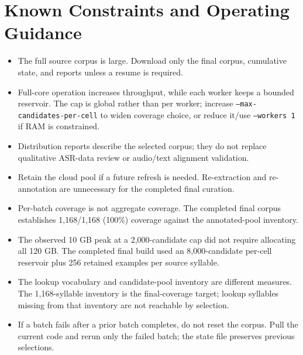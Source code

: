 \documentclass[11pt,a4paper]{article}
\begin{document}
\section{Known Constraints and Operating Guidance}
\begin{itemize}[leftmargin=1.7em]
\item The full source corpus is large. Download only the final corpus, cumulative state, and reports unless a resume is required.
\item Full-core operation increases throughput, while each worker keeps a bounded reservoir. The cap is global rather than per worker; increase \texttt{--max-candidates-per-cell} to widen coverage choice, or reduce it/use \texttt{--workers 1} if RAM is constrained.
\item Distribution reports describe the selected corpus; they do not replace qualitative ASR-data review or audio/text alignment validation.
\item Retain the cloud pool if a future refresh is needed. Re-extraction and re-annotation are unnecessary for the completed final curation.
\item Per-batch coverage is not aggregate coverage. The completed final corpus establishes 1,168/1,168 (100\%) coverage against the annotated-pool inventory.
\item The observed 10 GB peak at a 2,000-candidate cap did not require allocating all 120 GB. The completed final build used an 8,000-candidate per-cell reservoir plus 256 retained examples per source syllable.
\item The lookup vocabulary and candidate-pool inventory are different measures. The 1,168-syllable inventory is the final-coverage target; lookup syllables missing from that inventory are not reachable by selection.
\item If a batch fails after a prior batch completes, do not reset the corpus. Pull the current code and rerun only the failed batch; the state file preserves previous selections.
\end{itemize}
\end{document}
